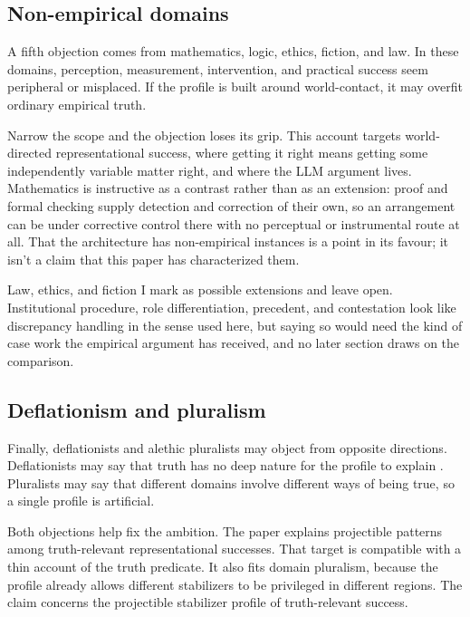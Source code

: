 \documentclass[12pt]{article}
\begin{document}
\subsection{Non-empirical domains}

A fifth objection comes from mathematics, logic, ethics, fiction, and law. In these
domains, perception, measurement, intervention, and practical success seem peripheral or
misplaced. If the profile is built around world-contact, it may overfit ordinary
empirical truth.

Narrow the scope and the objection loses its grip. This account targets world-directed
representational success, where getting it right means getting some independently
variable matter right, and where the LLM argument lives. Mathematics is
instructive as a contrast rather than as an extension: proof and formal checking supply
detection and correction of their own, so an arrangement can be under corrective control
there with no perceptual or instrumental route at all. That the architecture has
non-empirical instances is a point in its favour; it isn't a claim that this paper has
characterized them.

Law, ethics, and fiction I mark as possible extensions and leave open. Institutional
procedure, role differentiation, precedent, and contestation look like discrepancy
handling in the sense used here, but saying so would need the kind of case work the
empirical argument has received, and no later section draws on the comparison.

\subsection{Deflationism and pluralism}

Finally, deflationists and alethic pluralists may object from opposite directions.
Deflationists may say that truth has no deep nature for the profile to explain
\citep{horwich_1998_truth}. Pluralists may say that different domains involve different
ways of being true, so a single profile is artificial.

Both objections help fix the ambition. The paper explains projectible patterns among
truth-relevant representational successes. That target is compatible with a thin account
of the truth predicate. It also fits domain pluralism, because the profile already allows
different stabilizers to be privileged in different regions. The claim concerns the
projectible stabilizer profile of truth-relevant success.
\end{document}
